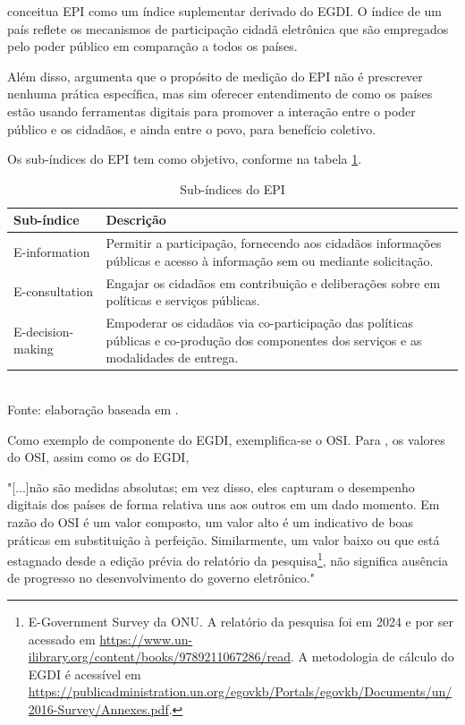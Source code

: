 \cite{ONU_EGDI_EPI_description} conceitua EPI como um índice suplementar derivado do EGDI. O índice de um país reflete os mecanismos de participação cidadã eletrônica que são empregados pelo poder público em comparação a todos os países.

Além disso, \cite{ONU_EGDI_EPI_description} argumenta que o propósito de medição do EPI não é prescrever nenhuma prática específica, mas sim oferecer entendimento de como os países estão usando ferramentas digitais para promover a interação entre o poder público e os cidadãos, e ainda entre o povo, para benefício coletivo.

Os sub-índices do EPI tem como objetivo, conforme \cite{ONU_EGDI_EPI_description} na tabela \ref{tab:epi_subindices}.

\begin{table}[H]
	\centering
	\label{tab:epi_subindices}
	\caption{Sub-índices do EPI}
	\begin{tabular}{@{}lp{10cm}@{}}
		\toprule
		\textbf{Sub-índice} & \textbf{Descrição} \\ \midrule
		E-information & Permitir a participação, fornecendo aos cidadãos informações públicas e acesso à informação sem ou mediante solicitação. \\ \midrule
		E-consultation & Engajar os cidadãos em contribuição e deliberações sobre em políticas e serviços públicas. \\ \midrule
		E-decision-making & Empoderar os cidadãos via co-participação das políticas públicas e co-produção dos componentes dos serviços e as modalidades de entrega. \\ \bottomrule
	\end{tabular}
	\\ \footnotesize{Fonte: elaboração baseada em \cite{ONU_EGDI_EPI_description}.}
\end{table}

Como exemplo de componente do EGDI, exemplifica-se o OSI. Para \cite{onu_egov_survey_2024}, os valores do OSI, assim como os do EGDI, 

\noindent
\begin{flushleft}
	\setlength{\leftskip}{4cm}
	\small
	"[...]não são medidas absolutas; em vez disso, eles capturam o desempenho digitais dos países de forma relativa uns aos outros em um dado momento. Em razão do OSI é um valor composto, um valor alto é um indicativo de boas práticas em substituição à perfeição. Similarmente, um valor baixo ou que está estagnado desde a edição prévia do relatório da pesquisa\footnote{E-Government Survey da ONU. A relatório da pesquisa foi em 2024 e por ser acessado em \url{https://www.un-ilibrary.org/content/books/9789211067286/read}. A metodologia de cálculo do EGDI é acessível em \url{https://publicadministration.un.org/egovkb/Portals/egovkb/Documents/un/2016-Survey/Annexes.pdf}.}, não significa ausência de progresso no desenvolvimento do governo eletrônico." \cite{onu_egov_survey_2024}
\end{flushleft}

